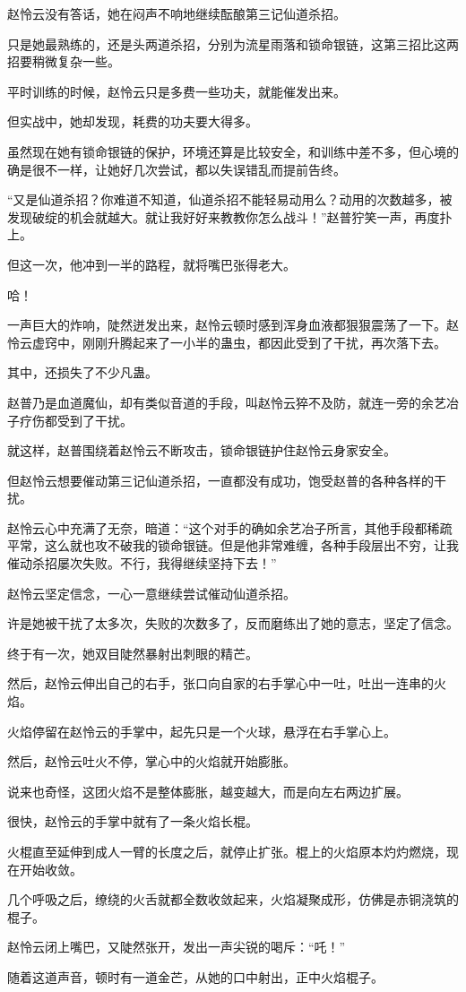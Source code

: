 \begin{this_body}
赵怜云没有答话，她在闷声不响地继续酝酿第三记仙道杀招。

只是她最熟练的，还是头两道杀招，分别为流星雨落和锁命银链，这第三招比这两招要稍微复杂一些。

平时训练的时候，赵怜云只是多费一些功夫，就能催发出来。

但实战中，她却发现，耗费的功夫要大得多。

虽然现在她有锁命银链的保护，环境还算是比较安全，和训练中差不多，但心境的确是很不一样，让她好几次尝试，都以失误错乱而提前告终。

“又是仙道杀招？你难道不知道，仙道杀招不能轻易动用么？动用的次数越多，被发现破绽的机会就越大。就让我好好来教教你怎么战斗！”赵普狞笑一声，再度扑上。

但这一次，他冲到一半的路程，就将嘴巴张得老大。

哈！

一声巨大的炸响，陡然迸发出来，赵怜云顿时感到浑身血液都狠狠震荡了一下。赵怜云虚窍中，刚刚升腾起来了一小半的蛊虫，都因此受到了干扰，再次落下去。

其中，还损失了不少凡蛊。

赵普乃是血道魔仙，却有类似音道的手段，叫赵怜云猝不及防，就连一旁的余艺冶子疗伤都受到了干扰。

就这样，赵普围绕着赵怜云不断攻击，锁命银链护住赵怜云身家安全。

但赵怜云想要催动第三记仙道杀招，一直都没有成功，饱受赵普的各种各样的干扰。

赵怜云心中充满了无奈，暗道：“这个对手的确如余艺冶子所言，其他手段都稀疏平常，这么就也攻不破我的锁命银链。但是他非常难缠，各种手段层出不穷，让我催动杀招屡次失败。不行，我得继续坚持下去！”

赵怜云坚定信念，一心一意继续尝试催动仙道杀招。

许是她被干扰了太多次，失败的次数多了，反而磨练出了她的意志，坚定了信念。

终于有一次，她双目陡然暴射出刺眼的精芒。

然后，赵怜云伸出自己的右手，张口向自家的右手掌心中一吐，吐出一连串的火焰。

火焰停留在赵怜云的手掌中，起先只是一个火球，悬浮在右手掌心上。

然后，赵怜云吐火不停，掌心中的火焰就开始膨胀。

说来也奇怪，这团火焰不是整体膨胀，越变越大，而是向左右两边扩展。

很快，赵怜云的手掌中就有了一条火焰长棍。

火棍直至延伸到成人一臂的长度之后，就停止扩张。棍上的火焰原本灼灼燃烧，现在开始收敛。

几个呼吸之后，缭绕的火舌就都全数收敛起来，火焰凝聚成形，仿佛是赤铜浇筑的棍子。

赵怜云闭上嘴巴，又陡然张开，发出一声尖锐的喝斥：“吒！”

随着这道声音，顿时有一道金芒，从她的口中射出，正中火焰棍子。

\end{this_body}


